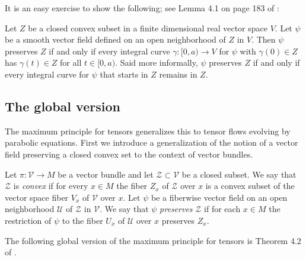 It is an easy exercise to show the following; see Lemma 4.1 on page
183 of \cite{Hamilton4MPCO}:

\begin{lemma}
\label{lem:integral-curve-preserves-convex-set}
Let $Z$ be a closed convex subset in a finite dimensional real
vector space $V$. Let $\psi$ be a smooth vector field defined on an
open neighborhood of $Z$ in $V$. Then $\psi$ preserves $Z$ if and
only if  every integral curve $\gamma\colon [0,a)\to V$ for $\psi$
with $\gamma(0)\in Z$ has $\gamma(t)\in Z$ for all $t\in [0,a)$.
Said more informally, $\psi$ preserves $Z$ if and only if every
integral curve for $\psi$ that starts in $Z$ remains in $Z$.
\end{lemma}




\subsection{The global
version}\label{4.3.3}

The maximum principle for tensors generalizes this to tensor flows
evolving by parabolic equations. First we introduce a generalization
of the notion of a vector field preserving a closed convex set to
the context of vector bundles.

\begin{definition}
\label{def:convex-subbundle-preserving-vector-field}
 Let $\pi\colon {\mathcal V}\to M$ be a vector bundle and let
${\mathcal Z}\subset {\mathcal V}$ be  a closed subset. We say that
${\mathcal Z}$ is {\em convex} if  for every $x\in M$ the fiber
$Z_x$ of ${\mathcal Z}$ over $x$ is a convex subset of the vector
space fiber $V_x$ of ${\mathcal V}$ over $x$. Let $\psi$ be a
fiberwise vector field on an open neighborhood ${\mathcal U}$ of
${\mathcal Z}$ in ${\mathcal V}$. We say that $\psi$ {\em preserves}
${\mathcal Z}$ if for each $x\in M$ the restriction of $\psi$ to the
fiber $U_x$ of ${\mathcal U}$ over $x$ preserves $Z_x$.
\end{definition}

The following global version of the maximum principle for tensors is
Theorem 4.2 of  \cite{Hamilton4MPCO}.

